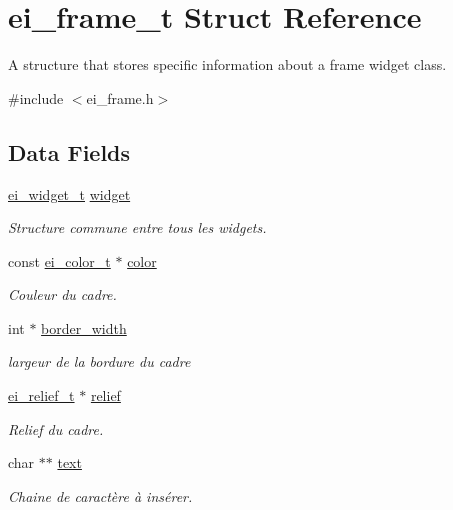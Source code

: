 \hypertarget{structei__frame__t}{\section{ei\-\_\-frame\-\_\-t Struct Reference}
\label{structei__frame__t}
}


A structure that stores specific information about a frame widget class.  




{\ttfamily \#include $<$ei\-\_\-frame.\-h$>$}

\subsection*{Data Fields}
\begin{DoxyCompactItemize}
\item 
\hyperlink{structei__widget__t}{ei\-\_\-widget\-\_\-t} \hyperlink{structei__frame__t_a712db0711a6f2da5e96df73f562572b6}{widget}
\begin{DoxyCompactList}\small\item\em Structure commune entre tous les widgets. \end{DoxyCompactList}\item 
const \hyperlink{structei__color__t}{ei\-\_\-color\-\_\-t} $\ast$ \hyperlink{structei__frame__t_afd5c5dd800d9f24a52345093ba053185}{color}
\begin{DoxyCompactList}\small\item\em Couleur du cadre. \end{DoxyCompactList}\item 
int $\ast$ \hyperlink{structei__frame__t_af9014a63bb45010387c762ac93bc0052}{border\-\_\-width}
\begin{DoxyCompactList}\small\item\em largeur de la bordure du cadre \end{DoxyCompactList}\item 
\hyperlink{ei__types_8h_aa79a32b1d8ece0e44cfa394e870b270b}{ei\-\_\-relief\-\_\-t} $\ast$ \hyperlink{structei__frame__t_ae547648681fd8fdf017041d60387ab3d}{relief}
\begin{DoxyCompactList}\small\item\em Relief du cadre. \end{DoxyCompactList}\item 
char $\ast$$\ast$ \hyperlink{structei__frame__t_a17c0d110f2f3fe98e566d7ac3769786b}{text}
\begin{DoxyCompactList}\small\item\em Chaine de caractère à insérer. \end{DoxyCompactList}\item 
$$
\end{DoxyCompactItemize}
